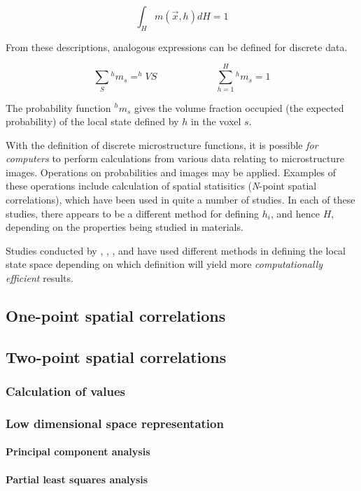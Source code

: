 \[
  \int_H m(\vec{x}, h)dH = 1
\]

From these descriptions, analogous expressions can be defined for discrete data.

\[
  \sum_{S} {^hm_s} = ^hVS \hspace{1in}
  \sum_{h=1}^{H} {^hm_s} = 1
\]

The probability function $^hm_s$ gives the volume fraction occupied (the expected probability) of the local state defined by $h$ in the voxel $s$.

With the definition of discrete microstructure functions, it is possible \emph{for computers} to perform calculations from various data relating to microstructure images.
Operations on probabilities and images may be applied.
Examples of these operations include calculation of spatial statisitics (\textit{N}-point spatial correlations), which have been used in quite a number of studies.
In each of these studies, there appears to be a different method for defining $h_i$, and hence $H$, depending on the properties being studied in materials.

Studies conducted by , , , and  have used different methods in defining the local state space depending on which definition will yield more \emph{computationally efficient} results.

\subsection{One-point spatial correlations}
\subsection{Two-point spatial correlations}
\subsubsection{Calculation of values}
\subsubsection{Low dimensional space representation}
\paragraph{Principal component analysis}
\paragraph{Partial least squares analysis}

